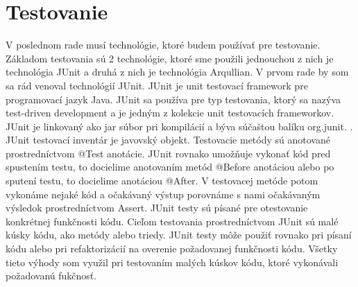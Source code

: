 \section{Testovanie}
V poslednom rade musí technológie, ktoré budem používať pre testovanie. Základom testovania sú 2 technológie, ktoré sme použili jednouchou z nich je technológia JUnit a druhá z nich je technológia Arqullian.
V prvom rade by som sa rád venoval technológií JUnit. JUnit je unit testovací framework pre programovací jazyk Java. JUnit sa používa pre typ testovania, ktorý sa nazýva test-driven development a je jedným z kolekcie unit testovacích frameworkov. JUnit je linkovaný ako jar súbor pri kompilácií a býva súčaštou balíku org.junit. \cite{junitbook}. JUnit testovací inventár je javovský objekt. Testovacie metódy sú anotované prostredníctvom @Test anotácie. JUnit rovnako umožňuje vykonať kód pred spustením testu, to docielime anotovaním metód @Before anotáciou alebo po sputení testu, to docielime anotáciou @After. V testovacej metóde potom vykonáme nejaké kód a očakávaný výstup porovnáme s nami očakávaným výsledok prostredníctvom Assert. JUnit testy sú písané pre otestovanie konkrétnej funkčnosti kódu. Cieľom testovania prostredníctvom JUnit sú malé kúsky kódu, ako metódy alebo triedy. JUnit testy môže použiť rovnako pri písaní kódu alebo pri refaktorizácií na overenie požadovanej funkčnosti kódu. Všetky tieto výhody som využil pri testovaním malých kúskov kódu, ktoré vykonávali požadovanú fukčnosť.

